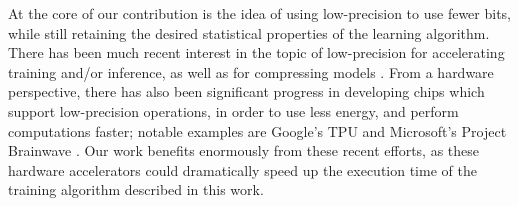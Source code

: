 At the core of our contribution is the idea of using low-precision to use fewer bits, while still retaining the desired statistical properties of the learning algorithm.  There has been much recent interest in the topic of low-precision for accelerating training and/or inference, as well as for compressing models \citep{gupta15,hogwild15,hubara16,halp18,desa17,han15}.  From a hardware perspective, there has also been significant progress in developing chips which support low-precision operations, in order to use less energy, and perform computations faster; notable examples are Google's TPU \citep{tpu17} and Microsoft's Project Brainwave \citep{brainwave17}. Our work benefits enormously from these recent efforts, as these hardware accelerators could dramatically speed up the execution time of the training algorithm described in this work.
